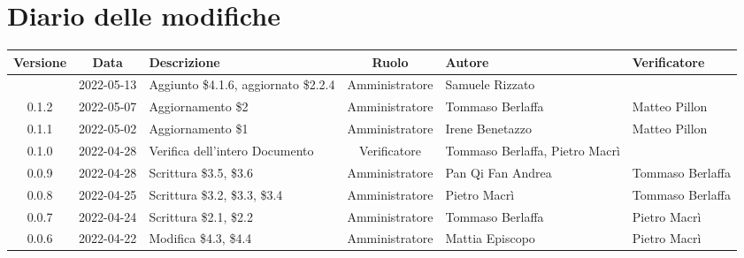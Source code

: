 \section*{Diario delle modifiche}
	\begin{center}
	\renewcommand{\arraystretch}{1.8} %
	\begin{longtable}{ |c|c|p{8em}|c|m{5em}|m{6em}| }
	\hline
	\textbf{Versione} & \textbf{Data} & \textbf{Descrizione} &  \textbf{Ruolo} &  \textbf{Autore} & \textbf{Verificatore}\\ %
	\hline %
	 & 2022-05-13 & Aggiunto \$4.1.6, aggiornato \$2.2.4 & Amministratore & Samuele \newline Rizzato & \\
    \hline
	0.1.2 & 2022-05-07 & Aggiornamento \$2 & Amministratore & Tommaso \newline Berlaffa & Matteo \newline Pillon\\
    \hline
	0.1.1 & 2022-05-02 & Aggiornamento \$1 & Amministratore & Irene \newline Benetazzo & Matteo \newline Pillon\\
	\hline
	0.1.0 & 2022-04-28 & Verifica dell'intero Documento & Verificatore & Tommaso Berlaffa, \newline Pietro Macrì & \\
	\hline
	0.0.9 & 2022-04-28 & Scrittura \newline \$3.5, \$3.6 & Amministratore & Pan Qi Fan \newline Andrea & Tommaso \newline Berlaffa\\
	\hline
	0.0.8 & 2022-04-25 & Scrittura \newline \$3.2, \$3.3, \$3.4 & Amministratore& Pietro \newline Macrì & Tommaso \newline Berlaffa\\
	\hline
	0.0.7 & 2022-04-24 & Scrittura \newline \$2.1, \$2.2 & Amministratore & Tommaso \newline Berlaffa & Pietro \newline Macrì\\
	\hline
	0.0.6 & 2022-04-22 & Modifica \newline \$4.3, \$4.4 & Amministratore & Mattia \newline Episcopo & Pietro \newline Macrì\\

\end{longtable}
\end{center}
